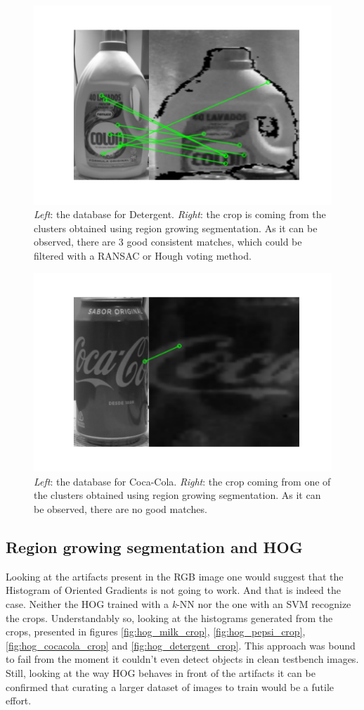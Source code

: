 \documentclass[../main.tex]{subfiles}
\begin{document}
\begin{figure}[H]
    \centering
    \includegraphics[width=0.7\linewidth]{images/sift_detergent_crop.png}
    \caption{\emph{Left}: the database for Detergent. \emph{Right}: the crop is coming from the clusters obtained using region growing segmentation. As it can be observed, there are 3 good consistent matches, which could be filtered with a RANSAC or Hough voting method.}
    \label{fig:sift_detergent_crop}
\end{figure}

\begin{figure}[H]
    \centering
    \includegraphics[width=0.7\linewidth]{images/sift_cocacola_crop.png}
    \caption{\emph{Left}: the database for Coca-Cola. \emph{Right}: the crop coming from one of the clusters obtained using region growing segmentation. As it can be observed, there are no good matches.}
    \label{fig:sift_cocacola_crop}
\end{figure}

\subsection{Region growing segmentation and HOG}
Looking at the artifacts present in the RGB image one would suggest that the Histogram of Oriented Gradients is not going to work. And that is indeed the case. Neither the HOG trained with a \emph{k}-NN nor the one with an SVM recognize the crops. Understandably so, looking at the histograms generated from the crops, presented in figures \ref{fig:hog_milk_crop}, \ref{fig:hog_pepsi_crop}, \ref{fig:hog_cocacola_crop} and \ref{fig:hog_detergent_crop}. This approach was bound to fail from the moment it couldn't even detect objects in clean testbench images. Still, looking at the way HOG behaves in front of the artifacts it can be confirmed that curating a larger dataset of images to train would be a futile effort.
\end{document}
